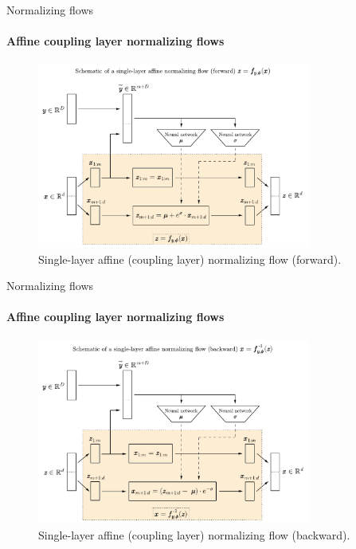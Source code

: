 \documentclass{beamer}
\begin{document}
\begin{frame}[allowframebreaks]{Normalizing flows}
\vspace{-0.5cm}
\framesubtitle{Affine coupling layer normalizing flows}
\begin{figure}[h]
	\centering
	\includegraphics[width=0.8\textwidth]{figures/thesis/affinenormalizingflow_forward.pdf}
	\caption{Single-layer affine (coupling layer) normalizing flow (forward).}
	\label{fig:nflowaffine_forward}
\end{figure}
\end{frame}

\begin{frame}[allowframebreaks]{Normalizing flows}
	\vspace{-0.5cm}
	\framesubtitle{Affine coupling layer normalizing flows}
	\begin{figure}[h]
		\centering
		\includegraphics[width=0.8\textwidth]{figures/thesis/affinenormalizingflow_backward.pdf}
		\caption{Single-layer affine (coupling layer) normalizing flow (backward).}
		\label{fig:nflowaffine_backward}
	\end{figure}
\end{frame}
\end{document}
